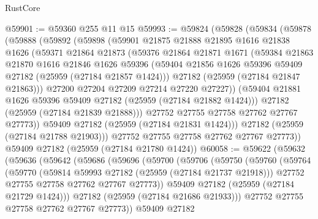 \begin{lexlean}{RustCore}
\begin{coremodule}
@59901 := @59360 @255 @11 @15
@59993 := @59824
    (@59828
      (@59834
        (@59878
          (@59888
            (@59892
              (@59898
                (@59901
                  @21875
                  @21888
                  @21895
                  @1616
                  @21838
                  @1626
                  (@59371
                    @21864
                    @21873
                    (@59376
                      @21864
                      @21871
                      @1671
                      (@59384
                        @21863
                        @21870
                        @1616
                        @21846
                        @1626
                        @59396
                        (@59404 @21856 @1626 @59396 @59409 @27182 (@25959 (@27184 @21857 @1424)))
                        @27182
                        (@25959 (@27184 @21847 @21863)))
                      @27200
                      @27204
                      @27209
                      @27214
                      @27220
                      @27227))
                  (@59404 @21881 @1626 @59396 @59409 @27182 (@25959 (@27184 @21882 @1424)))
                  @27182
                  (@25959 (@27184 @21839 @21888)))
                @27752
                @27755
                @27758
                @27762
                @27767
                @27773))
            @59409
            @27182
            (@25959 (@27184 @21831 @1424)))
          @27182
          (@25959 (@27184 @21788 @21903)))
        @27752
        @27755
        @27758
        @27762
        @27767
        @27773))
    @59409
    @27182
    (@25959 (@27184 @21780 @1424))
@60058 := @59622
    (@59632
      (@59636
        (@59642
          (@59686
            (@59696
              (@59700
                (@59706
                  (@59750
                    (@59760
                      (@59764
                        (@59770
                          (@59814 @59993 @27182 (@25959 (@27184 @21737 @21918)))
                          @27752
                          @27755
                          @27758
                          @27762
                          @27767
                          @27773))
                      @59409
                      @27182
                      (@25959 (@27184 @21729 @1424)))
                    @27182
                    (@25959 (@27184 @21686 @21933)))
                  @27752
                  @27755
                  @27758
                  @27762
                  @27767
                  @27773))
              @59409
              @27182

\end{coremodule}
\end{lexlean}
